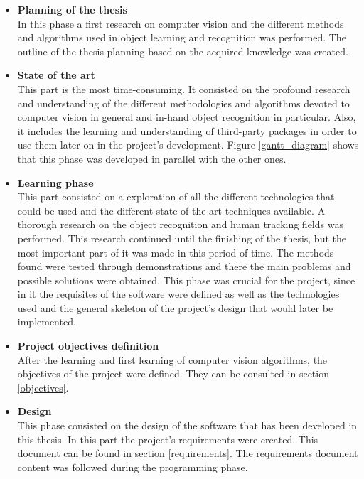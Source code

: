 		 \begin{itemize}
		 		\item{\textbf{Planning of the thesis}} \\
		 		In this phase a first research on computer vision and the different methods and algorithms used in object learning and recognition was performed. 
		 		The outline of the thesis planning based on the acquired knowledge was created. 

			 	\item{\textbf{State of the art}} \\
			 	This part is the most time-consuming.
			 	It consisted on the profound research and understanding of the different methodologies and algorithms devoted to computer vision in general and in-hand object recognition in particular. 
			 	Also, it includes the learning and understanding of third-party packages in order to use them later on in the project's development. 
			 	Figure \ref{gantt_diagram} shows that this phase was developed in parallel with the other ones. 

			 	\item{\textbf{Learning phase}} \\
			 	This part consisted on a exploration of all the different technologies that could be used and the different state of the art techniques available. A thorough research on the object recognition and human tracking fields was performed. This research continued until the finishing of the thesis, but the most important part of it was made in this period of time. 
			 	The methods found were tested through demonstrations and there the main problems and possible solutions were obtained. This phase was crucial for the project, since in it the requisites of the software were defined as well as the technologies used and the general skeleton of the project's design that would later be implemented. 
			 	\\

			 	\item{\textbf{Project objectives definition}} \\

			 	After the learning and first learning of computer vision algorithms, the objectives of the project were defined. 
			 	They can be consulted in section \ref{objectives}. 

			 	\item{\textbf{Design}} \\
			 	This phase consisted on the design of the software that has been developed in this thesis. 
			 	In this part the project's requirements were created. 
			 	This document can be found in section \ref{requirements}. 
			 	The requirements document content was followed during the programming phase. 


\end{itemize}
